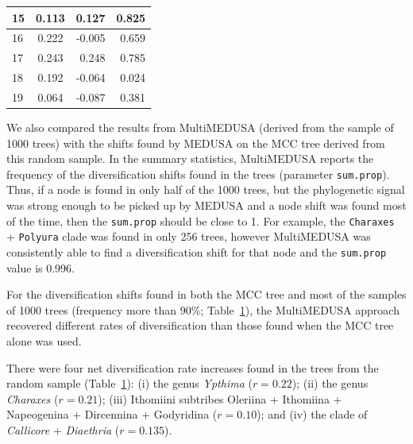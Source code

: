 \documentclass[10pt,letterpaper]{article}
\begin{document}
\begin{table}[!ht]
\begin{adjustwidth}{-2.25in}{0in}
\begin{tabular}{|l|c|r|r|}
15         & 0.113          & 0.127                      & 0.825                          \\ \hline
16         & 0.222          & -0.005                     & 0.659                          \\ \hline
17         & 0.243          & 0.248                      & 0.785                          \\ \hline
18         & 0.192          & -0.064                     & 0.024                          \\ \hline
19         & 0.064          & -0.087                     & 0.381                          \\ \hline
\end{tabular}
\begin{flushleft}
\end{flushleft}
\label{table2}
\end{adjustwidth}
\end{table}

We also compared the results from MultiMEDUSA (derived from the sample
of 1000 trees) with the shifts found by MEDUSA on the MCC tree derived
from this random sample. In the summary statistics, MultiMEDUSA reports
the frequency of the diversification shifts found in the trees
(parameter \texttt{sum.prop}). Thus, if a node is found in only half of
the 1000 trees, but the phylogenetic signal was strong enough to be
picked up by MEDUSA and a node shift was found most of the time, then
the \texttt{sum.prop} should be close to 1. For example, the
\texttt{Charaxes} + \texttt{Polyura} clade was found in only 256 trees,
however MultiMEDUSA was consistently able to find a diversification
shift for that node and the \texttt{sum.prop} value is 0.996.

For the diversification shifts found in both the MCC tree and most of
the samples of 1000 trees (frequency more than 90\%; Table~\ref{table2}), the
MultiMEDUSA approach recovered different rates of diversification than
those found when the MCC tree alone was used.

There were four net diversification rate increases found in the trees from the
random sample (Table~\ref{table2}): (i) the
genus \emph{Ypthima} (\(r = 0.22\)); (ii) the genus \emph{Charaxes}
(\(r = 0.21\)); (iii) Ithomiini subtribes Oleriina + Ithomiina + Napeogenina +
Dircennina + Godyridina (\(r = 0.10\)); and (iv) the clade of 
\emph{Callicore} + \emph{Diaethria} (\(r = 0.135\)).
\end{document}
